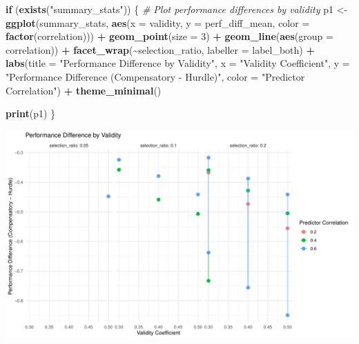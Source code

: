 \documentclass[
]{article}
\newenvironment{Shaded}{\begin{snugshade}}{\end{snugshade}}
\newcommand{\AttributeTok}[1]{\textcolor[rgb]{0.13,0.29,0.53}{#1}}
\newcommand{\CommentTok}[1]{\textcolor[rgb]{0.56,0.35,0.01}{\textit{#1}}}
\newcommand{\ControlFlowTok}[1]{\textcolor[rgb]{0.13,0.29,0.53}{\textbf{#1}}}
\newcommand{\DecValTok}[1]{\textcolor[rgb]{0.00,0.00,0.81}{#1}}
\newcommand{\FunctionTok}[1]{\textcolor[rgb]{0.13,0.29,0.53}{\textbf{#1}}}
\newcommand{\NormalTok}[1]{#1}
\newcommand{\OtherTok}[1]{\textcolor[rgb]{0.56,0.35,0.01}{#1}}
\newcommand{\SpecialCharTok}[1]{\textcolor[rgb]{0.81,0.36,0.00}{\textbf{#1}}}
\newcommand{\StringTok}[1]{\textcolor[rgb]{0.31,0.60,0.02}{#1}}
\begin{document}
\begin{Shaded}
\begin{Highlighting}[]
\ControlFlowTok{if}\NormalTok{ (}\FunctionTok{exists}\NormalTok{(}\StringTok{"summary\_stats"}\NormalTok{)) \{}
  \CommentTok{\# Plot performance differences by validity}
\NormalTok{  p1 }\OtherTok{\textless{}{-}} \FunctionTok{ggplot}\NormalTok{(summary\_stats, }\FunctionTok{aes}\NormalTok{(}\AttributeTok{x =}\NormalTok{ validity, }\AttributeTok{y =}\NormalTok{ perf\_diff\_mean, }
                                 \AttributeTok{color =} \FunctionTok{factor}\NormalTok{(correlation))) }\SpecialCharTok{+}
    \FunctionTok{geom\_point}\NormalTok{(}\AttributeTok{size =} \DecValTok{3}\NormalTok{) }\SpecialCharTok{+}
    \FunctionTok{geom\_line}\NormalTok{(}\FunctionTok{aes}\NormalTok{(}\AttributeTok{group =}\NormalTok{ correlation)) }\SpecialCharTok{+}
    \FunctionTok{facet\_wrap}\NormalTok{(}\SpecialCharTok{\textasciitilde{}}\NormalTok{selection\_ratio, }\AttributeTok{labeller =}\NormalTok{ label\_both) }\SpecialCharTok{+}
    \FunctionTok{labs}\NormalTok{(}\AttributeTok{title =} \StringTok{"Performance Difference by Validity"}\NormalTok{,}
         \AttributeTok{x =} \StringTok{"Validity Coefficient"}\NormalTok{,}
         \AttributeTok{y =} \StringTok{"Performance Difference (Compensatory {-} Hurdle)"}\NormalTok{,}
         \AttributeTok{color =} \StringTok{"Predictor Correlation"}\NormalTok{) }\SpecialCharTok{+}
    \FunctionTok{theme\_minimal}\NormalTok{()}
  
  \FunctionTok{print}\NormalTok{(p1)}
\NormalTok{\}}
\end{Highlighting}
\end{Shaded}

\begin{center}\includegraphics{ock_oswald_2018_report_files/figure-latex/validity_effect-1} \end{center}
\end{document}
